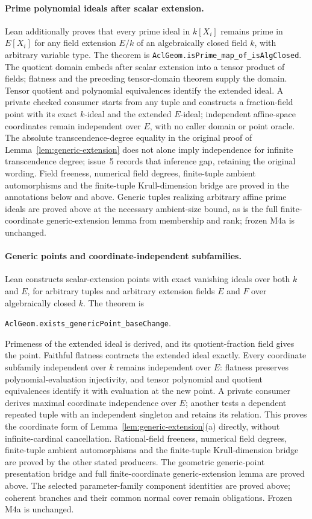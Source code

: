 \documentclass[11pt,oneside]{article}
\theoremstyle{definition}
\theoremstyle{remark}
\begin{document}
\clearpage
\paragraph{Prime polynomial ideals after scalar extension.}
Lean additionally proves that every prime ideal in $k[X_i]$ remains prime
in $E[X_i]$ for any field extension $E/k$ of an algebraically closed field $k$,
with arbitrary variable type. The theorem is
\texttt{AclGeom.isPrime\_map\_of\_isAlgClosed}.
The quotient domain embeds after scalar extension into a tensor product
of fields; flatness and the preceding tensor-domain theorem supply the domain.
Tensor quotient and polynomial equivalences identify the extended ideal.
A private checked consumer starts from any tuple and constructs a fraction-field
point with its exact $k$-ideal and the extended $E$-ideal; independent affine-space
coordinates remain independent over $E$, with no caller domain or point oracle.
The absolute transcendence-degree equality in the original proof of
Lemma~\ref{lem:generic-extension} does not alone imply independence for infinite
transcendence degree; issue~5 records that inference gap, retaining the original
wording. Field freeness, numerical field degrees, finite-tuple ambient automorphisms
and the finite-tuple Krull-dimension bridge are proved in the annotations below
and above. Generic tuples realizing arbitrary affine prime ideals are proved
above at the necessary ambient-size bound, as is the full finite-coordinate
generic-extension lemma from membership and rank; frozen M4a is unchanged.

\clearpage
\paragraph{Generic points and coordinate-independent subfamilies.}
Lean constructs scalar-extension points with exact vanishing ideals over
both $k$ and $E$, for arbitrary tuples and arbitrary extension fields $E$ and $F$
over algebraically closed $k$. The theorem is
\par\noindent
\texttt{AclGeom.exists\_genericPoint\_baseChange}.
\par\noindent
Primeness of the extended ideal is derived, and its quotient-fraction field
gives the point. Faithful flatness contracts the extended ideal exactly.
Every coordinate subfamily independent over $k$ remains independent over $E$:
flatness preserves polynomial-evaluation injectivity, and tensor polynomial
and quotient equivalences identify it with evaluation at the new point.
A private consumer derives maximal coordinate independence over $E$; another
tests a dependent repeated tuple with an independent singleton and retains
its relation. This proves the coordinate form of
Lemma~\ref{lem:generic-extension}(a) directly, without infinite-cardinal
cancellation. Rational-field freeness, numerical field degrees, finite-tuple ambient
automorphisms and the finite-tuple Krull-dimension bridge are proved by the
other stated producers. The geometric generic-point presentation bridge and
full finite-coordinate generic-extension lemma are proved above.
The selected parameter-family component identities are proved above;
coherent branches and their common normal cover remain obligations.
Frozen M4a is unchanged.
\end{document}
